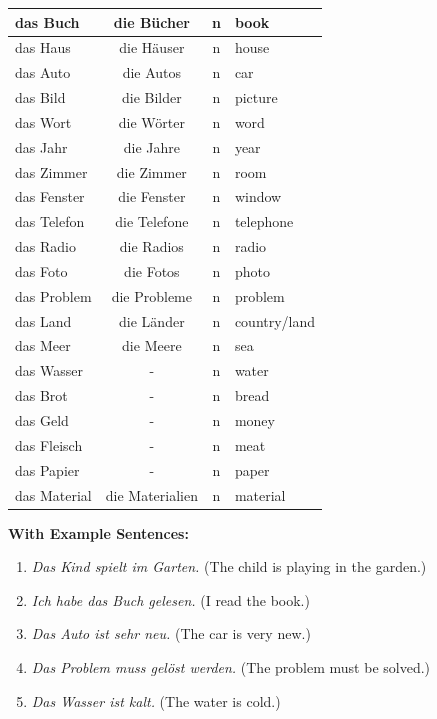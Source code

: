 \begin{center}
\begin{tabular}{|l|c|c|l|}
\hline
das Buch & die Bücher & n & book \\ \hline
das Haus & die Häuser & n & house \\ \hline
das Auto & die Autos & n & car \\ \hline
das Bild & die Bilder & n & picture \\ \hline
das Wort & die Wörter & n & word \\ \hline
das Jahr & die Jahre & n & year \\ \hline
das Zimmer & die Zimmer & n & room \\ \hline
das Fenster & die Fenster & n & window \\ \hline
das Telefon & die Telefone & n & telephone \\ \hline
das Radio & die Radios & n & radio \\ \hline
das Foto & die Fotos & n & photo \\ \hline
das Problem & die Probleme & n & problem \\ \hline
das Land & die Länder & n & country/land \\ \hline
das Meer & die Meere & n & sea \\ \hline
das Wasser & - & n & water \\ \hline
das Brot & - & n & bread \\ \hline
das Geld & - & n & money \\ \hline
das Fleisch & - & n & meat \\ \hline
das Papier & - & n & paper \\ \hline
das Material & die Materialien & n & material \\ \hline
\end{tabular}
\end{center}

\bigskip
\noindent\textbf{With Example Sentences:}

\begin{enumerate}
    \item \textit{Das Kind spielt im Garten.} (The child is playing in the garden.)
    \item \textit{Ich habe das Buch gelesen.} (I read the book.)
    \item \textit{Das Auto ist sehr neu.} (The car is very new.)
    \item \textit{Das Problem muss gelöst werden.} (The problem must be solved.)
    \item \textit{Das Wasser ist kalt.} (The water is cold.)
\end{enumerate}

